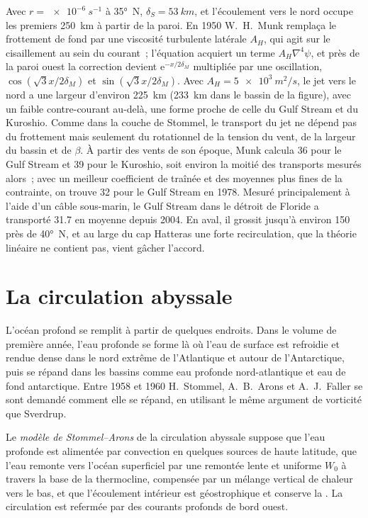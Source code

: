 Avec $r = \qty{e-6}{s^{-1}}$ à \ang{35}~N, $\delta_S = \qty{53}{km}$, et
l'écoulement vers le nord occupe les premiers \qty{250}{km} à partir de la paroi. En 1950
W.~H.~Munk remplaça le frottement de fond par une viscosité turbulente latérale $A_H$,
qui agit sur le cisaillement au sein du courant~; l'équation acquiert un terme
$A_H\nabla^4\psi$, et près de la paroi ouest la correction devient
$\mathrm e^{-x/2\delta_M}$ multipliée par une oscillation, $\cos(\sqrt3x/2\delta_M)$
et $\sin(\sqrt3x/2\delta_M)$. Avec $A_H = \qty{5e3}{m^2/s}$, le jet vers le nord
a une largeur d'environ \qty{225}{km} (\qty{233}{km} dans le bassin de la figure),
avec un faible contre-courant au-delà, une forme proche de celle du Gulf Stream et
du Kuroshio. Comme dans la couche de Stommel, le transport du jet ne
dépend pas du frottement mais seulement du rotationnel de la tension du vent, de la largeur du
bassin et de $\beta$. À partir des vents de son époque, Munk calcula
\qty{36}{\sverdrup} pour le Gulf Stream et \qty{39}{\sverdrup} pour le
Kuroshio, soit environ la moitié des transports mesurés alors~; avec un meilleur coefficient
de traînée et des moyennes plus fines de la contrainte, on trouve \qty{32}{\sverdrup} pour le Gulf Stream en 1978.
Mesuré principalement à l'aide d'un câble sous-marin, le
Gulf Stream dans le détroit de Floride a transporté \qty{31.7}{\sverdrup} en
moyenne depuis 2004. En aval, il grossit jusqu'à environ \qty{150}{\sverdrup} près de
\ang{40}~N, et au large du cap Hatteras une forte recirculation, que la
théorie linéaire ne contient pas, vient gâcher l'accord.

\section{La circulation abyssale}\label{sec:b3:ocean-dynamics:abyssal}

L'océan profond se remplit à partir de quelques endroits. Dans le volume de première année, l'eau profonde
se forme là où l'eau de surface est refroidie et rendue dense dans le nord extrême de l'Atlantique
et autour de l'Antarctique, puis se répand dans les bassins comme
eau profonde nord-atlantique et eau de fond antarctique. Entre 1958 et 1960
H.~Stommel, A.~B.~Arons et A.~J.~Faller se sont demandé comment elle se répand, en utilisant le
même argument de vorticité que Sverdrup.

\begin{definition}\label{def:b3:ocean-dynamics:abyssal}
Le \emph{modèle de Stommel--Arons} de la
circulation abyssale suppose que l'eau profonde est alimentée par convection en quelques
sources de haute latitude, que l'eau remonte vers l'océan superficiel par une remontée lente et uniforme
$W_0$ à travers la base de la thermocline, compensée par un mélange
vertical de chaleur vers le bas, et que l'écoulement intérieur est géostrophique et conserve
la . La circulation est refermée par des courants
profonds de bord ouest.
\end{definition}

